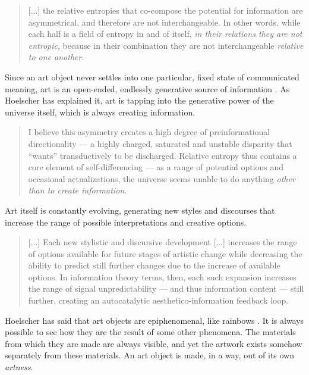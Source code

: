                 \begin{quote}
                    [...] the relative entropies that co-compose the potential for information are asymmetrical, and therefore are not interchangeable. In other words, while each half is a field of entropy in and of itself, \emph{in their relations they are not entropic}, because in their combination they are not interchangeable \emph{relative to one another}.
                \end{quote}
                    
                Since an art object never settles into one particular, fixed state of communicated meaning, art is an open-ended, endlessly generative source of information \citep[p.7]{HoelscherThPtcsOfPhsSpc2014}. As Hoelscher has explained it, art is tapping into the generative power of the universe itself, which is always creating information.

                \begin{quote}
                    I believe this asymmetry creates a high degree of preinformational directionality — a highly charged, saturated and unstable disparity that “wants” transductively to be discharged. Relative entropy thus contains a core element of self-differencing — as a range of potential options and occasional actualizations, the universe seems unable to do anything \emph{other than to create information}.
                \end{quote}

                Art itself is constantly evolving, generating new styles and discourses that increase the range of possible interpretations and creative options.

                \begin{quote}
                    [...] Each new stylistic and discursive development [...] increases the range of options available for future stages of artistic change while decreasing the ability to predict still further changes due to the increase of available options. In information theory terms, then, each such expansion increases the range of signal unpredictability — and thus information content — still further, creating an autocatalytic aesthetico-information feedback loop. \citep[p.2]{HoelscherThPtcsOfPhsSpc2014}
                \end{quote}

                Hoelscher has said that art objects are epiphenomenal, like rainbows \citep[p.17]{HoelscherArtAsInfrmtn2021}. It is always possible to see how they are the result of some other phenomena. The materials from which they are made are always visible, and yet the artwork exists somehow separately from these materials. An art object is made, in a way, out of its own \emph{artness}.
                
